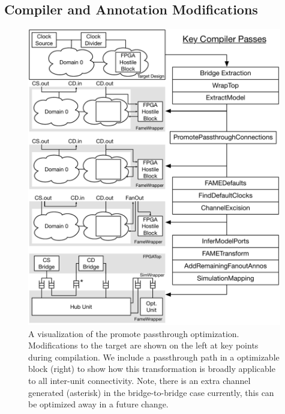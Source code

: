 \subsection{Compiler and Annotation Modifications}\label{sec:pdes-compiler-modifications}

\begin{figure}
    \centering
    \includegraphics[width=0.99\textwidth]{figures/promote-passthroughs.pdf}
    \caption{A visualization of the promote passthrough optimization.
    Modifications to the target are shown on the left at key points during
    compilation. We include a passthrough path in a optimizable block (right)
    to show how this transformation is broadly applicable to all inter-unit
    connectivity. Note, there is an extra channel generated (asterisk) in the
    bridge-to-bridge case currently, this can be optimized away in a future change.}
    \label{fig:promote-passthroughs}
\end{figure}

